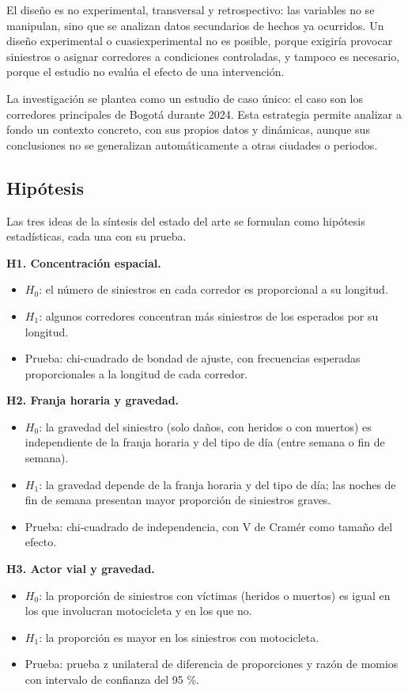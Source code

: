 \documentclass[12pt,letterpaper]{article}
\providecommand{\tightlist}{\setlength{\itemsep}{2pt}\setlength{\parskip}{0pt}}
\begin{document}
El diseño es no experimental, transversal y retrospectivo: las variables
no se manipulan, sino que se analizan datos secundarios de hechos ya
ocurridos. Un diseño experimental o cuasiexperimental no es posible,
porque exigiría provocar siniestros o asignar corredores a condiciones
controladas, y tampoco es necesario, porque el estudio no evalúa el
efecto de una intervención.

La investigación se plantea como un estudio de caso único: el caso son
los corredores principales de Bogotá durante 2024. Esta estrategia
permite analizar a fondo un contexto concreto, con sus propios datos y
dinámicas, aunque sus conclusiones no se generalizan automáticamente a
otras ciudades o periodos.

\hypertarget{hipuxf3tesis}{%
\subsection{Hipótesis}\label{hipuxf3tesis}}

Las tres ideas de la síntesis del estado del arte se
formulan como hipótesis estadísticas, cada una con su prueba.

\textbf{H1. Concentración espacial.}
\begin{itemize}
\tightlist
\item
  $H_0$: el número de siniestros en cada corredor es proporcional a su
  longitud.
\item
  $H_1$: algunos corredores concentran más siniestros de los esperados
  por su longitud.
\item
  Prueba: chi-cuadrado de bondad de ajuste, con frecuencias esperadas
  proporcionales a la longitud de cada corredor.
\end{itemize}

\textbf{H2. Franja horaria y gravedad.}
\begin{itemize}
\tightlist
\item
  $H_0$: la gravedad del siniestro (solo daños, con heridos o con
  muertos) es independiente de la franja horaria y del tipo de día
  (entre semana o fin de semana).
\item
  $H_1$: la gravedad depende de la franja horaria y del tipo de día; las
  noches de fin de semana presentan mayor proporción de siniestros
  graves.
\item
  Prueba: chi-cuadrado de independencia, con V de Cramér como tamaño del
  efecto.
\end{itemize}

\textbf{H3. Actor vial y gravedad.}
\begin{itemize}
\tightlist
\item
  $H_0$: la proporción de siniestros con víctimas (heridos o muertos) es
  igual en los que involucran motocicleta y en los que no.
\item
  $H_1$: la proporción es mayor en los siniestros con motocicleta.
\item
  Prueba: prueba z unilateral de diferencia de proporciones y razón de
  momios con intervalo de confianza del 95 \%.
\end{itemize}
\end{document}

